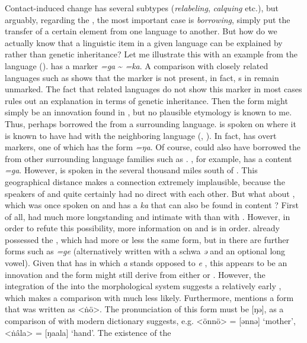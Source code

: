 Contact-induced change has several subtypes (\textit{relabeling}, \textit{calquing} etc.), but arguably, regarding the , the most important case is \textit{borrowing}, simply put the transfer of a certain element from one language to another. But how do we actually know that a linguistic item in a given language can be explained by  rather than genetic inheritance? Let me illustrate this with an example from the  language  ().  has a  marker \textit{=ga} {\textasciitilde} \textit{=ka}. A comparison with closely related languages such as  shows that the marker is not present, in fact, s in  remain unmarked. The fact that related languages do not show this marker in most cases rules out an explanation in terms of genetic inheritance. Then the form might simply be an innovation found in , but no plausible etymology is known to me. Thus,  perhaps borrowed the  from a surrounding language.  is spoken on  where it is known to have had  with the neighboring language  (\citealt{Yamada2010}, ). In fact,  has overt  markers, one of which has the form \textit{=ŋa}. Of course,  could also have borrowed the  from other surrounding language families such as . , for example, has a content  \textit{=ga}. However,  is spoken in the  several thousand miles south of . This geographical distance makes a connection extremely implausible, because the speakers of  and  quite certainly had no direct  with each other. But what about , which was once spoken on  and has a  \textit{ka}  that can also be found in content ? First of all,  had much more longstanding and intimate  with  than with . However, in order to refute this possibility, more information on  and  is in order.  already possessed the , which had more or less the same form, but in  there are further forms such as \textit{=ge} (alternatively written with a schwa \textit{ə} and an optional long vowel). Given that  has  in which \textit{a} stands opposed to \textit{e} \citep[3]{Tsumagari2009b}, this appears to be an innovation and the form might still derive from either  or . However, the integration of the  into the morphological system suggests a relatively early , which makes a comparison with  much less likely. Furthermore, \citet[50ff.]{Nakanome1928} mentions a form that was written as <ṅö>. The pronunciation of this form must be [ŋə], as a comparison of \citet{Nakanome1928} with  modern dictionary suggests, e.g. <önnö> = [ənnə] ‘mother’, <ṅâla> = [ŋaala] ‘hand’. The existence of the 